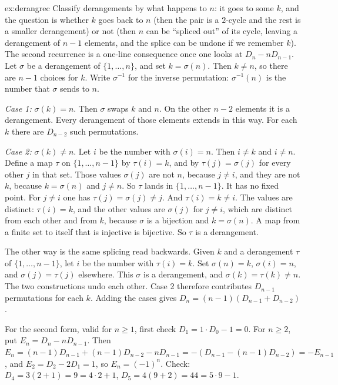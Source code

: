 \begin{solution}{ex:derangrec}
\idea Classify derangements by what happens to $n$: it goes to some $k$, and the question is whether $k$ goes back to $n$ (then the pair is a $2$-cycle and the rest is a smaller derangement) or not (then $n$ can be ``spliced out'' of its cycle, leaving a derangement of $n-1$ elements, and the splice can be undone if we remember $k$). The second recurrence is a one-line consequence once one looks at $D_n-nD_{n-1}$.
\writeup Let $\sigma$ be a derangement of $\{1,\dots,n\}$, and set $k=\sigma(n)$. Then $k\ne n$, so there are $n-1$ choices for $k$. Write $\sigma^{-1}$ for the inverse permutation: $\sigma^{-1}(n)$ is the number that $\sigma$ sends to $n$.

\emph{Case 1:} $\sigma(k)=n$. Then $\sigma$ swaps $k$ and $n$. On the other $n-2$ elements it is a derangement. Every derangement of those elements extends in this way. For each $k$ there are $D_{n-2}$ such permutations.

\emph{Case 2:} $\sigma(k)\ne n$. Let $i$ be the number with $\sigma(i)=n$. Then $i\ne k$ and $i\ne n$. Define a map $\tau$ on $\{1,\dots,n-1\}$ by $\tau(i)=k$, and by $\tau(j)=\sigma(j)$ for every other $j$ in that set. Those values $\sigma(j)$ are not $n$, because $j\ne i$, and they are not $k$, because $k=\sigma(n)$ and $j\ne n$. So $\tau$ lands in $\{1,\dots,n-1\}$. It has no fixed point. For $j\ne i$ one has $\tau(j)=\sigma(j)\ne j$. And $\tau(i)=k\ne i$. The values are distinct: $\tau(i)=k$, and the other values are $\sigma(j)$ for $j\ne i$, which are distinct from each other and from $k$, because $\sigma$ is a bijection and $k=\sigma(n)$. A map from a finite set to itself that is injective is bijective. So $\tau$ is a derangement.

The other way is the same splicing read backwards. Given $k$ and a derangement $\tau$ of $\{1,\dots,n-1\}$, let $i$ be the number with $\tau(i)=k$. Set $\sigma(n)=k$, $\sigma(i)=n$, and $\sigma(j)=\tau(j)$ elsewhere. This $\sigma$ is a derangement, and $\sigma(k)=\tau(k)\ne n$. The two constructions undo each other. Case 2 therefore contributes $D_{n-1}$ permutations for each $k$. Adding the cases gives $D_n=(n-1)(D_{n-1}+D_{n-2})$.

For the second form, valid for $n\ge1$, first check $D_1=1\cdot D_0-1=0$. For $n\ge2$, put $E_n=D_n-nD_{n-1}$. Then $E_n=(n-1)D_{n-1}+(n-1)D_{n-2}-nD_{n-1}=-(D_{n-1}-(n-1)D_{n-2})=-E_{n-1}$, and $E_2=D_2-2D_1=1$, so $E_n=(-1)^n$. Check: $D_4=3(2+1)=9=4\cdot2+1$, $D_5=4(9+2)=44=5\cdot9-1$.
\end{solution}

